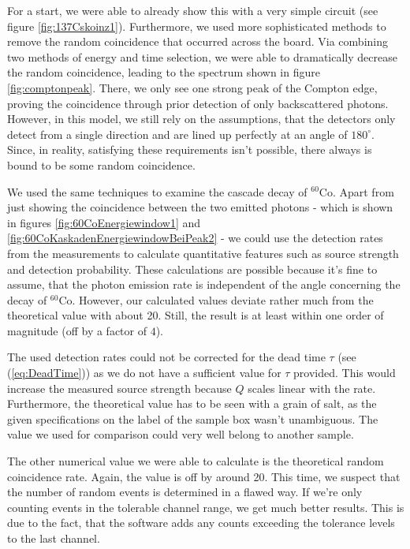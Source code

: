 For a start, we were able to already show this with a very simple circuit (see figure \ref{fig:137Cskoinz1}).
Furthermore, we used more sophisticated methods to remove the random coincidence that occurred across the board.
Via combining two methods of energy and time selection, we were able to dramatically decrease the random coincidence, leading to the spectrum shown in figure \ref{fig:comptonpeak}.
There, we only see one strong peak of the Compton edge, proving the coincidence through prior detection of only backscattered photons.
However, in this model, we still rely on the assumptions, that the detectors only detect from a single direction and are lined up perfectly at an angle of $180^{\circ}$.
Since, in reality, satisfying these requirements isn't possible, there always is bound to be some random coincidence.
%
\par
%
We used the same techniques to examine the cascade decay of $^{60}\text{Co}$.
Apart from just showing the coincidence between the two emitted photons - which is shown in figures \ref{fig:60CoEnergiewindow1} and \ref{fig:60CoKaskadenEnergiewindowBeiPeak2} - we could use the detection rates from the measurements to calculate quantitative features such as source strength and detection probability.
These calculations are possible because it's fine to assume, that the photon emission rate is independent of the angle concerning the decay of $^{60}\text{Co}$.
However, our calculated values deviate rather much from the theoretical value with about \SI{20}{\sigma}.
Still, the result is at least within one order of magnitude (off by a factor of $4$).
%
\par
%
The used detection rates could not be corrected for the dead time $\tau$ (see (\ref{eq:DeadTime})) as we do not have a sufficient value for $\tau$ provided.
This would increase the measured source strength because $Q$ scales linear with the rate.
Furthermore, the theoretical value has to be seen with a grain of salt, as the given specifications on the label of the sample box wasn't unambiguous.
The value we used for comparison could very well belong to another sample.
%
\par
%
The other numerical value we were able to calculate is the theoretical random coincidence rate.
Again, the value is off by around \SI{20}{\sigma}.
This time, we suspect that the number of random events is determined in a flawed way.
If we're only counting events in the tolerable channel range, we get much better results.
This is due to the fact, that the software adds any counts exceeding the tolerance levels to the last channel.
